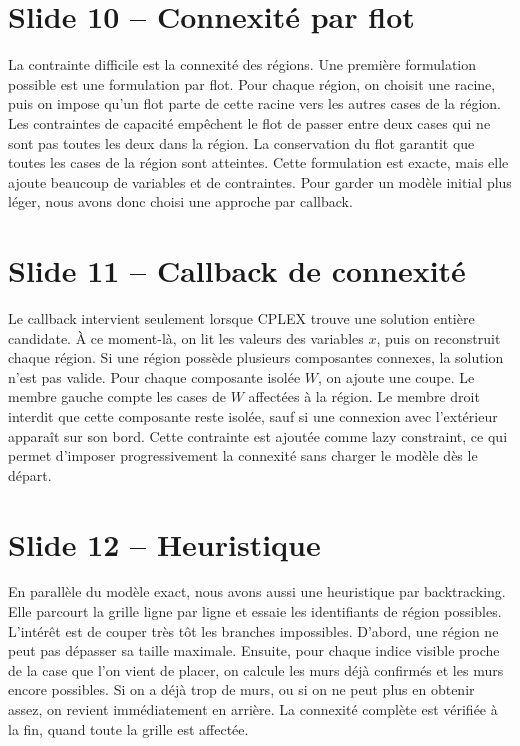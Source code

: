 \documentclass[11pt,a4paper]{article}
\begin{document}
\section*{Slide 10 -- Connexité par flot}

La contrainte difficile est la connexité des régions. Une première formulation possible est une formulation par flot. Pour chaque région, on choisit une racine, puis on impose qu'un flot parte de cette racine vers les autres cases de la région. Les contraintes de capacité empêchent le flot de passer entre deux cases qui ne sont pas toutes les deux dans la région. La conservation du flot garantit que toutes les cases de la région sont atteintes. Cette formulation est exacte, mais elle ajoute beaucoup de variables et de contraintes. Pour garder un modèle initial plus léger, nous avons donc choisi une approche par callback.

\section*{Slide 11 -- Callback de connexité}

Le callback intervient seulement lorsque CPLEX trouve une solution entière candidate. À ce moment-là, on lit les valeurs des variables \(x\), puis on reconstruit chaque région. Si une région possède plusieurs composantes connexes, la solution n'est pas valide. Pour chaque composante isolée \(W\), on ajoute une coupe. Le membre gauche compte les cases de \(W\) affectées à la région. Le membre droit interdit que cette composante reste isolée, sauf si une connexion avec l'extérieur apparaît sur son bord. Cette contrainte est ajoutée comme lazy constraint, ce qui permet d'imposer progressivement la connexité sans charger le modèle dès le départ.

\section*{Slide 12 -- Heuristique}

En parallèle du modèle exact, nous avons aussi une heuristique par backtracking. Elle parcourt la grille ligne par ligne et essaie les identifiants de région possibles. L'intérêt est de couper très tôt les branches impossibles. D'abord, une région ne peut pas dépasser sa taille maximale. Ensuite, pour chaque indice visible proche de la case que l'on vient de placer, on calcule les murs déjà confirmés et les murs encore possibles. Si on a déjà trop de murs, ou si on ne peut plus en obtenir assez, on revient immédiatement en arrière. La connexité complète est vérifiée à la fin, quand toute la grille est affectée.
\end{document}
